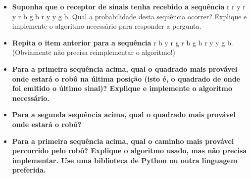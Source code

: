 \begin{itemize}
    \item \textbf{Suponha que o receptor de sinais tenha recebido a sequência}
    r r y r y r b g b r y y g b. Qual a probabilidade desta sequência ocorrer? Explique e implemente o algoritmo necessário para responder a pergunta.
    \item \textbf{Repita o item anterior para a sequência}
    r b y r g r b g b r y y g b. (Obviamente não precisa reimplementar o algoritmo!)
    \item \textbf{Para a primeira sequência acima, qual o quadrado mais provável onde estará o robô na última posição (isto é, o quadrado de onde foi emitido o último sinal)? Explique e implemente o algoritmo necessário.}
    \item \textbf{Para a segunda sequência acima, qual o quadrado mais provável onde estará o robô?}
    \item \textbf{Para a primeira sequência acima, qual o caminho mais provável percorrido pelo robô? Explique o algoritmo usado, mas não precisa implementar. Use uma biblioteca de Python ou outra linguagem preferida.}
\end{itemize}


